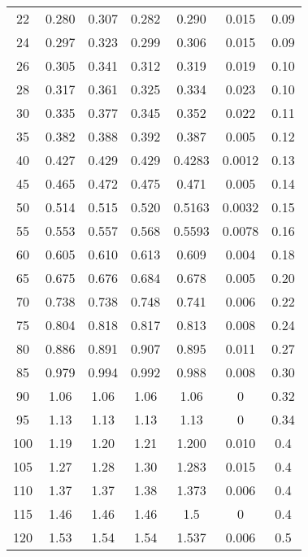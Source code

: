 \begin{table}[H]
\begin{tabular}{
        S[table-format=3.0] 
        S[table-format=1.4] S[table-format=1.4] S[table-format=1.4]
        S[table-format=1.4] S[table-format=1.4] S[table-format=1.3]
        }
        22  &  0.280  & 0.307  &  0.282  &0.290  & 0.015  & 0.09  \\
        24  &  0.297  & 0.323  &  0.299  &0.306  & 0.015  & 0.09  \\
        26  &  0.305  & 0.341  &  0.312  &0.319  & 0.019  & 0.10  \\
        28  &  0.317  & 0.361  &  0.325  &0.334  & 0.023  & 0.10  \\
        30  &  0.335  & 0.377  &  0.345  &0.352  & 0.022  & 0.11  \\
        35  &  0.382  & 0.388  &  0.392  &0.387  & 0.005  & 0.12  \\
        40  &  0.427  & 0.429  &  0.429  &0.4283 & 0.0012 & 0.13  \\
        45  &  0.465  & 0.472  &  0.475  &0.471  & 0.005  & 0.14  \\
        50  &  0.514  & 0.515  &  0.520  &0.5163 & 0.0032 & 0.15  \\
        55  &  0.553  & 0.557  &  0.568  &0.5593 & 0.0078 & 0.16  \\
        60  &  0.605  & 0.610  &  0.613  &0.609  & 0.004  & 0.18  \\
        65  &  0.675  & 0.676  &  0.684  &0.678  & 0.005  & 0.20  \\
        70  &  0.738  & 0.738  &  0.748  &0.741  & 0.006  & 0.22  \\
        75  &  0.804  & 0.818  &  0.817  &0.813  & 0.008  & 0.24  \\
        80  &  0.886  & 0.891  &  0.907  &0.895  & 0.011  & 0.27  \\
        85  &  0.979  & 0.994  &  0.992  &0.988  & 0.008  & 0.30  \\
        90  &  1.06   & 1.06   &  1.06   &1.06   & 0      & 0.32  \\
        95  &  1.13   & 1.13   &  1.13   &1.13   & 0      & 0.34  \\
        100 &  1.19   & 1.20   &  1.21   &1.200  & 0.010  & 0.4   \\
        105 &  1.27   & 1.28   &  1.30   &1.283  & 0.015  & 0.4   \\
        110 &  1.37   & 1.37   &  1.38   &1.373  & 0.006  & 0.4   \\
        115 &  1.46   & 1.46   &  1.46   &1.5    & 0      & 0.4   \\
        120 &  1.53   & 1.54   &  1.54   &1.537  & 0.006  & 0.5   \\
        \bottomrule 
      \end{tabular}
\end{table}
